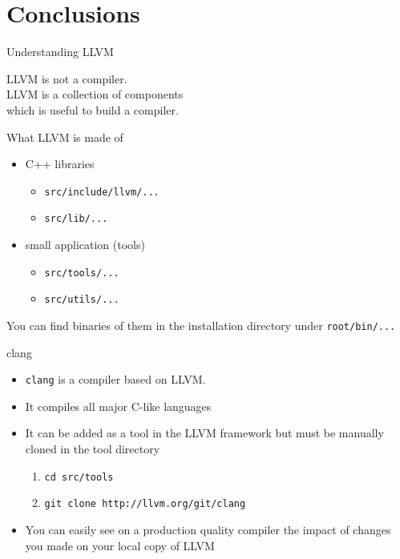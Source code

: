 \documentclass[10pt,mathserif]{beamer}
\begin{document}

\section{Conclusions}
\begin{frame}{Understanding LLVM}
	\begin{center}
		\huge{
			LLVM is not a compiler.\\
			\pause
			\vfill
			LLVM is a collection of components\\
			which is useful to build a compiler.
		}
	\end{center}
\end{frame}

\begin{frame}{What LLVM is made of}
	\begin{itemize}
		\item C++ libraries
		\begin{itemize}
			\item \texttt{src/include/llvm/...}
			\item \texttt{src/lib/...}
		\end{itemize}
		\vfill
		\item small application (tools)
		\begin{itemize}
			\item \texttt{src/tools/...}
			\item \texttt{src/utils/...}
		\end{itemize}
	\end{itemize}
	\vfill
	You can find binaries of them in the installation directory under \texttt{root/bin/...}
\end{frame}

\begin{frame}{clang}
	\begin{itemize}
		\item \texttt{clang} is a compiler based on LLVM.
		\vfill
		\item It compiles all major C-like languages
		\vfill
		\item It can be added as a tool in the LLVM framework but must be manually cloned in the tool directory
		\begin{enumerate}
			\item \texttt{cd src/tools}
			\item \texttt{git clone http://llvm.org/git/clang}
		\end{enumerate}
		\vfill
		\item You can easily see on a production quality compiler the impact of changes you made on your local copy of LLVM
	\end{itemize}
\end{frame}
\end{document}
